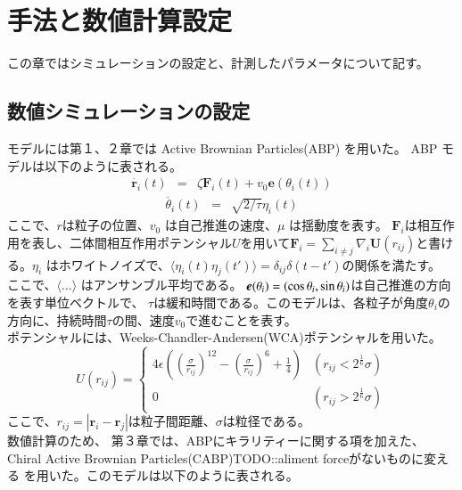 \documentclass[/Users/ikedahajime/GitHub/reserch/master_report/thesis]{subfiles}
\begin{document}
\chapter{手法と数値計算設定}
この章ではシミュレーションの設定と、計測したパラメータについて記す。
\section{数値シミュレーションの設定}
モデルには第１、２章では Active Brownian Particles(ABP)\cite{filyAthermalPhaseSeparation2012} を用いた。 ABP モデルは以下のように表される。
\begin{eqnarray}
    \dot{\bm{r}_i}(t) &=& \zeta \bm{F}_i(t)+v_0 \bm{e}(\theta_i (t))
\end{eqnarray}
\begin{eqnarray}
    \dot{\theta_i }(t) &=& \sqrt{2/\tau}\eta_i(t)
\end{eqnarray}
ここで、\mbox{\boldmath$r$}は粒子の位置、$v_0$ は自己推進の速度、$\mu$ は揺動度を表す。
$\bm{F}_i$は相互作用を表し、二体間相互作用ポテンシャル$U$を用いて$\bm{F}_i=\sum_{i\neq j} \nabla_i\bm{U}(r_{ij})$と書ける。$\eta_i$ はホワイトノイズで、$\langle \eta_i(t) \eta_j(t') \rangle=\delta_{ij}\delta(t-t')$の関係を満たす。
ここで、$\langle \dots \rangle$ はアンサンブル平均である。
$\mbox{\boldmath$e$}(\theta_i)=(\cos\theta_i,\sin \theta_i)$は自己推進の方向を表す単位ベクトルで、
$\tau$は緩和時間である。このモデルは、各粒子が角度$\theta_i$の方向に、持続時間$\tau$の間、速度$v_0$で進むことを表す。\\
ポテンシャルには、Weeks-Chandler-Andersen(WCA)ポテンシャル\cite{weeksRoleRepulsiveForces1971}を用いた。
\begin{equation}
    U(r_{ij})=
    \begin{cases}
        4\epsilon\left(\left(\frac{\sigma}{r_{ij}}\right)^{12}-\left(\frac{\sigma}{r_{ij}}\right)^6+\frac{1}{4}\right) & (r_{ij}<2^{\frac{1}{6}}\sigma)\\
        0 &(r_{ij}>2^{\frac{1}{6}}\sigma)
    \end{cases}
\end{equation}
ここで、$r_{ij}=\left|\bm{r}_i-\bm{r}_j\right|$は粒子間距離、$\sigma$は粒径である。\\
数値計算のため、
第３章では、ABPにキラリティーに関する項を加えた、 Chiral Active Brownian Particles(CABP)\cite{teeffelenDynamicsBrownianCircle2008}TODO::aliment forceがないものに変える を用いた。このモデルは以下のように表される。
\end{document}
